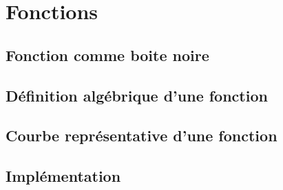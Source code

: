 
\chapter{Fonctions}

\section{Fonction comme boite noire}

\section{Définition algébrique d'une fonction}

\section{Courbe représentative d'une fonction}

\section{Implémentation}


